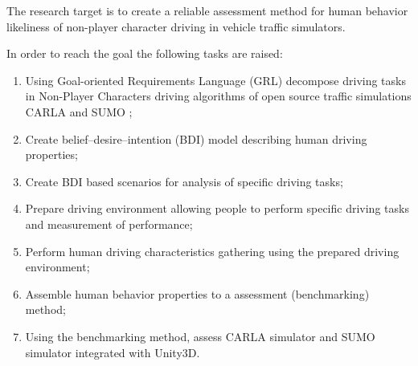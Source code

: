 \documentclass{VUMIFPS-master-intro}
\begin{document}
The research target is to create a reliable assessment method for human behavior likeliness of non-player character driving in vehicle traffic simulators.

In order to reach the goal the following tasks are raised:
\begin{enumerate}
	\item Using Goal-oriented Requirements Language (GRL) decompose driving tasks in Non-Player Characters driving algorithms of open source traffic simulations CARLA \cite{Dosovitskiy2017} and SUMO \cite{Biurrun2017};
	\item Create belief–desire–intention (BDI) model describing human driving properties;
	\item Create BDI based scenarios for analysis of specific driving tasks;
	\item Prepare driving environment allowing people to perform specific driving tasks and measurement of performance;
	\item Perform human driving characteristics gathering using the prepared driving environment;
	\item Assemble human behavior properties to a assessment (benchmarking) method;
	\item Using the benchmarking method, assess CARLA simulator and SUMO simulator integrated with Unity3D.
\end{enumerate}

\end{document}
